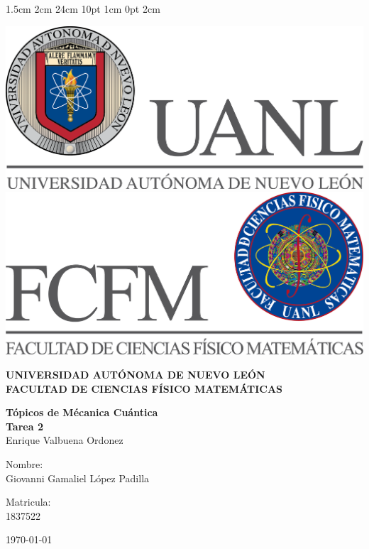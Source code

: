 \documentclass[12pt,letterpaper]{report}
\begin{document}
\setmargins{2.5cm}      
{1.5cm}                     
{2cm}  
{24cm}                    
{10pt}                          
{1cm}                          
{0pt}                             
{2cm}
\begin{titlepage}
\begin{center}
\includegraphics[scale=0.40]{../../Logos/uanl.png} 
\hspace{2.5cm}
\includegraphics[scale=0.40]{../../Logos/fcfm.png}
\end{center}
\vspace{2cm}
\begin{center}
\textbf{
UNIVERSIDAD AUTÓNOMA DE NUEVO LEÓN\\
FACULTAD DE CIENCIAS
    FÍSICO MATEMÁTICAS}\\
\vspace*{2cm}
\begin{large}
\vspace{1cm}
\large{\textbf{Tópicos de Mécanica Cuántica}}\\
\textbf{Tarea 2}\\
Enrique Valbuena Ordonez\\
\end{large}
\vspace{3.5cm}
\begin{minipage}{0.6\linewidth}
\vspace{0.5cm}
\changefontsizes{14pt}
Nombre:\\
Giovanni Gamaliel López Padilla\\
\end{minipage}
\begin{minipage}{0.2\linewidth}
\changefontsizes{14pt}
Matricula:\\
1837522
\end{minipage}
\end{center}
\vspace{4cm}
\begin{flushright}
\today
\end{flushright}
\end{titlepage}
\end{document}
